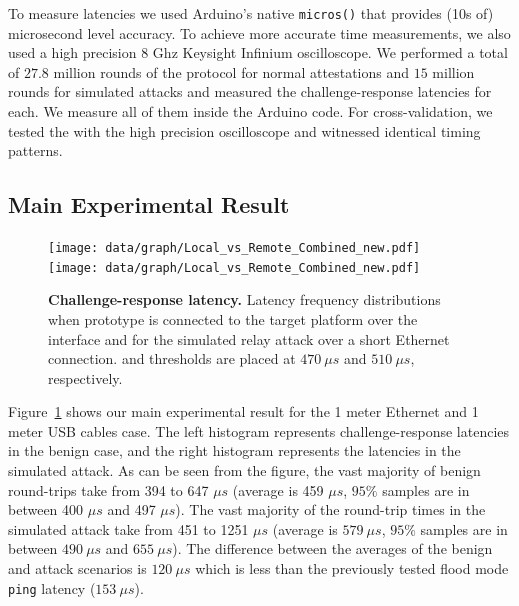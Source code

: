 To measure latencies we used Arduino's native \texttt{micros()} that provides (10s of) microsecond level accuracy. To achieve more accurate time measurements, we also used a high precision 8 Ghz Keysight Infinium oscilloscope. We performed a total of $27.8$ million rounds of the protocol for normal attestations and $15$ million rounds for simulated attacks and measured the challenge-response latencies for each. We measure all of them inside the Arduino code. For cross-validation, we tested the \device with the high precision oscilloscope and witnessed identical timing patterns.

\ifusenix
\vspace{-5pt}
\else
\fi
\subsection{Main Experimental Result}
\label{sec:evaluation:results}


\begin{figure}[t]
  \centering
    \ifusenix
    \texttt{[image: data/graph/Local\_vs\_Remote\_Combined\_new.pdf]}
    \else
    \texttt{[image: data/graph/Local\_vs\_Remote\_Combined\_new.pdf]}
    \fi
    \caption{\textbf{Challenge-response latency.} Latency frequency distributions when \device prototype is connected to the target platform over the \usb interface and for the simulated relay attack over a short Ethernet connection. \connect and \detach thresholds are placed at $470\ \mu s$ and $510\ \mu s$, respectively.}
    \vspace{-10pt}
    \label{graph:reroutingDetectionHist}
\end{figure}



Figure~\ref{graph:reroutingDetectionHist} shows our main experimental result for the 1 meter Ethernet and 1 meter USB cables case. The left histogram represents challenge-response latencies in the benign case, and the right histogram represents the latencies in the simulated attack. As can be seen from the figure, the vast majority of benign round-trips take from 394 to 647 $\mu s$ (average is 459 $\mu s$, $95\%$ samples are in between 400 $\mu s$ and 497 $\mu s$). The vast majority of the round-trip times in the simulated attack take from 451 to 1251 $\mu s$ (average is $579\ \mu s$, $95\%$ samples are in between $490\ \mu s$ and $655\ \mu s$).
%
The difference between the averages of the benign and attack scenarios is $120\ \mu s$ which is less than the previously tested flood mode \texttt{ping} latency ($153\ \mu s$). 

